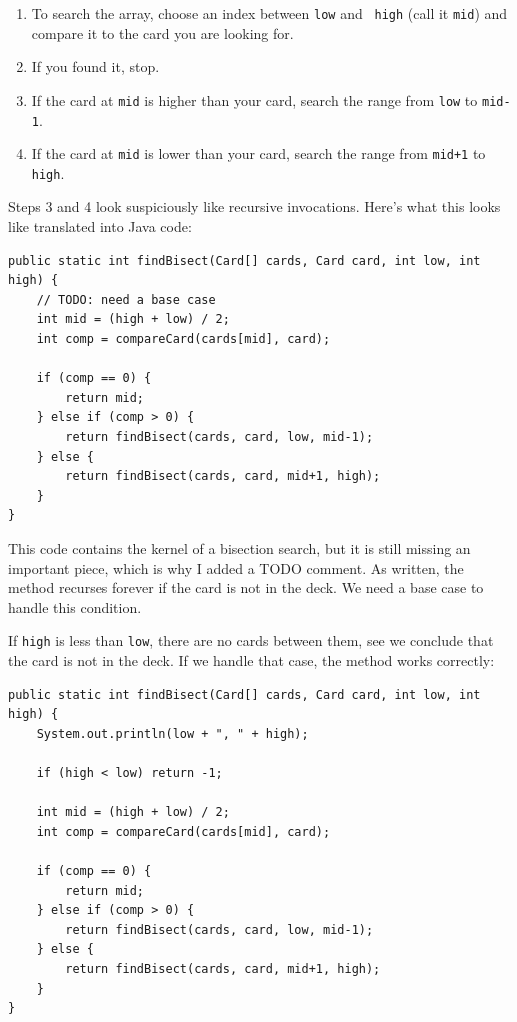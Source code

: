 \documentclass[12pt]{book}
\theoremstyle{exercise}
\begin{document}
\begin{enumerate}

\item To search the array, choose an index between {\tt low} and {\tt
high} (call it {\tt mid}) and compare it to the card you are looking
for.

\item If you found it, stop.

\item If the card at {\tt mid} is higher than your card, search
the range from {\tt low} to {\tt mid-1}.

\item If the card at {\tt mid} is lower than your card, search
the range from {\tt mid+1} to {\tt high}.

\end{enumerate}

Steps 3 and 4 look suspiciously like recursive invocations.  Here's
what this looks like translated into Java code:

\begin{lstlisting}
public static int findBisect(Card[] cards, Card card, int low, int high) {
    // TODO: need a base case
    int mid = (high + low) / 2;
    int comp = compareCard(cards[mid], card);

    if (comp == 0) {
        return mid;
    } else if (comp > 0) {
        return findBisect(cards, card, low, mid-1);
    } else {
        return findBisect(cards, card, mid+1, high);
    }
}
\end{lstlisting}
%
This code contains the kernel of a bisection search, but it
is still missing an important piece, which is why I added a TODO comment.
%
As written, the method recurses forever
if the card is not in the deck.  We
need a base case to handle this condition.

If {\tt high} is less than {\tt low},
there are no cards between them,
see we conclude that the card is not in the deck.
If we handle that case, the method works correctly:

\begin{lstlisting}
public static int findBisect(Card[] cards, Card card, int low, int high) {
    System.out.println(low + ", " + high);

    if (high < low) return -1;

    int mid = (high + low) / 2;
    int comp = compareCard(cards[mid], card);

    if (comp == 0) {
        return mid;
    } else if (comp > 0) {
        return findBisect(cards, card, low, mid-1);
    } else {
        return findBisect(cards, card, mid+1, high);
    }
}
\end{lstlisting}
\end{document}
